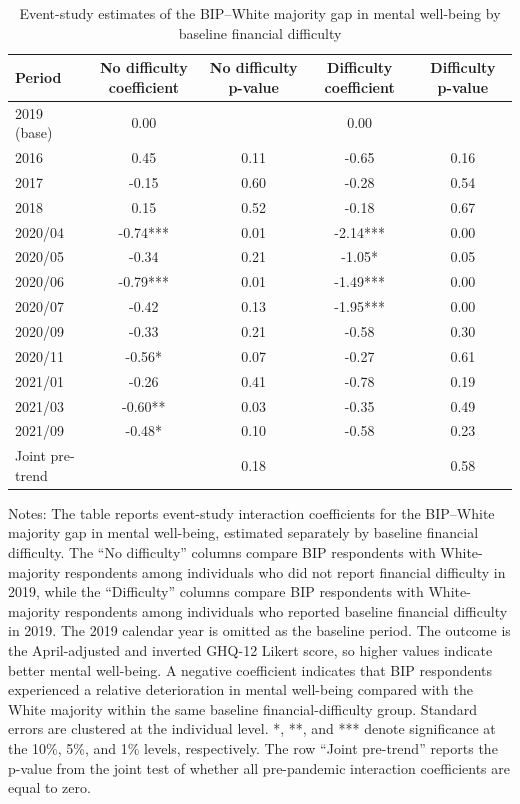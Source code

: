 \begin{table}[htbp]
\centering
\caption{Event-study estimates of the BIP--White majority gap in mental well-being by baseline financial difficulty}
\label{tab:event_study_bip_byfindiff}
\small
\begin{tabular}{lcccc}
\toprule
Period & No difficulty coefficient & No difficulty p-value & Difficulty coefficient & Difficulty p-value \\
\midrule
2019 (base) & 0.00 &  & 0.00 &  \\
2016 & 0.45 & 0.11 & -0.65 & 0.16 \\
2017 & -0.15 & 0.60 & -0.28 & 0.54 \\
2018 & 0.15 & 0.52 & -0.18 & 0.67 \\
2020/04 & -0.74*** & 0.01 & -2.14*** & 0.00 \\
2020/05 & -0.34 & 0.21 & -1.05* & 0.05 \\
2020/06 & -0.79*** & 0.01 & -1.49*** & 0.00 \\
2020/07 & -0.42 & 0.13 & -1.95*** & 0.00 \\
2020/09 & -0.33 & 0.21 & -0.58 & 0.30 \\
2020/11 & -0.56* & 0.07 & -0.27 & 0.61 \\
2021/01 & -0.26 & 0.41 & -0.78 & 0.19 \\
2021/03 & -0.60** & 0.03 & -0.35 & 0.49 \\
2021/09 & -0.48* & 0.10 & -0.58 & 0.23 \\
Joint pre-trend &  & 0.18 &  & 0.58 \\
\bottomrule
\end{tabular}

\begin{flushleft}
\footnotesize
Notes: The table reports event-study interaction coefficients for the BIP--White majority gap in mental well-being, estimated separately by baseline financial difficulty. The ``No difficulty'' columns compare BIP respondents with White-majority respondents among individuals who did not report financial difficulty in 2019, while the ``Difficulty'' columns compare BIP respondents with White-majority respondents among individuals who reported baseline financial difficulty in 2019. The 2019 calendar year is omitted as the baseline period. The outcome is the April-adjusted and inverted GHQ-12 Likert score, so higher values indicate better mental well-being. A negative coefficient indicates that BIP respondents experienced a relative deterioration in mental well-being compared with the White majority within the same baseline financial-difficulty group. Standard errors are clustered at the individual level. *, **, and *** denote significance at the 10\%, 5\%, and 1\% levels, respectively. The row ``Joint pre-trend'' reports the p-value from the joint test of whether all pre-pandemic interaction coefficients are equal to zero.
\end{flushleft}
\end{table}